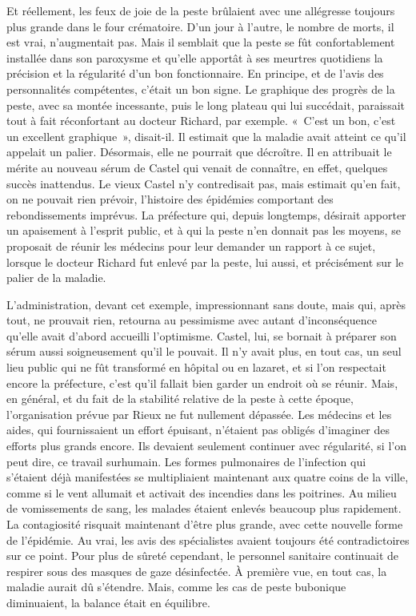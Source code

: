 \documentclass[french,twoside]{book} %
\begin{document}
Et réellement, les feux de joie de la peste brûlaient avec une allégresse toujours plus grande dans le four crématoire. D’un jour à l’autre, le nombre de morts, il est vrai, n’augmentait pas. Mais il semblait que la peste se fût confortablement installée dans son paroxysme et qu’elle apportât à ses meurtres quotidiens la précision et la régularité d’un bon fonctionnaire. En principe, et de l’avis des personnalités compétentes, c’était un bon signe. Le graphique des progrès de la peste, avec sa montée incessante, puis le long plateau qui lui succédait, paraissait tout à fait réconfortant au docteur Richard, par exemple. « C’est un bon, c’est un excellent graphique », disait-il. Il estimait que la maladie avait atteint ce qu’il appelait un palier. Désormais, elle ne pourrait que décroître. Il en attribuait le mérite au nouveau sérum de Castel qui venait de connaître, en effet, quelques succès inattendus. Le vieux Castel n’y contredisait pas, mais estimait qu’en fait, on ne pouvait rien prévoir, l’histoire des épidémies comportant des rebondissements imprévus. La préfecture qui, depuis longtemps, désirait apporter un apaisement à l’esprit public, et à qui la peste n’en donnait pas les moyens, se proposait de réunir les médecins pour leur demander un rapport à ce sujet, lorsque le docteur Richard fut enlevé par la peste, lui aussi, et précisément sur le palier de la maladie.\par
L’administration, devant cet exemple, impressionnant sans doute, mais qui, après tout, ne prouvait rien, retourna au pessimisme avec autant d’inconséquence qu’elle avait d’abord accueilli l’optimisme. Castel, lui, se bornait à préparer son sérum aussi soigneusement qu’il le pouvait. Il n’y avait plus, en tout cas, un seul lieu public qui ne fût transformé en hôpital ou en lazaret, et si l’on respectait encore la préfecture, c’est qu’il fallait bien garder un endroit où se réunir. Mais, en général, et du fait de la stabilité relative de la peste à cette époque, l’organisation prévue par Rieux ne fut nullement dépassée. Les médecins et les aides, qui fournissaient un effort épuisant, n’étaient pas obligés d’imaginer des efforts plus grands encore. Ils devaient seulement continuer avec régularité, si l’on peut dire, ce travail surhumain. Les formes pulmonaires de l’infection qui s’étaient déjà manifestées se multipliaient maintenant aux quatre coins de la ville, comme si le vent allumait et activait des incendies dans les poitrines. Au milieu de vomissements de sang, les malades étaient enlevés beaucoup plus rapidement. La contagiosité risquait maintenant d’être plus grande, avec cette nouvelle forme de l’épidémie. Au vrai, les avis des spécialistes avaient toujours été contradictoires sur ce point. Pour plus de sûreté cependant, le personnel sanitaire continuait de respirer sous des masques de gaze désinfectée. À première vue, en tout cas, la maladie aurait dû s’étendre. Mais, comme les cas de peste bubonique diminuaient, la balance était en équilibre.\par
\end{document}
